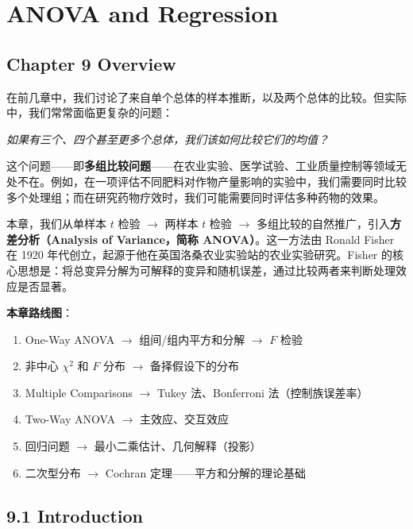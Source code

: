 
\chapter{ANOVA and Regression}\label{chap:anova-regression}

\section*{Chapter 9 Overview}

在前几章中，我们讨论了来自单个总体的样本推断，以及两个总体的比较。但实际中，我们常常面临更复杂的问题：

\begin{center}
\textit{如果有三个、四个甚至更多个总体，我们该如何比较它们的均值？}
\end{center}

这个问题——即\textbf{多组比较问题}——在农业实验、医学试验、工业质量控制等领域无处不在。例如，在一项评估不同肥料对作物产量影响的实验中，我们需要同时比较多个处理组；而在研究药物疗效时，我们可能需要同时评估多种药物的效果。

本章，我们从单样本 $t$ 检验 $\to$ 两样本 $t$ 检验 $\to$ 多组比较的自然推广，引入\textbf{方差分析（Analysis of Variance，简称 ANOVA）}。这一方法由 Ronald Fisher 在 1920 年代创立，起源于他在英国洛桑农业实验站的农业实验研究。Fisher 的核心思想是：将总变异分解为可解释的变异和随机误差，通过比较两者来判断处理效应是否显著。

\textbf{本章路线图}：
\begin{enumerate}
\item One-Way ANOVA $\to$ 组间/组内平方和分解 $\to$ $F$ 检验
\item 非中心 $\chi^2$ 和 $F$ 分布 $\to$ 备择假设下的分布
\item Multiple Comparisons $\to$ Tukey 法、Bonferroni 法（控制族误差率）
\item Two-Way ANOVA $\to$ 主效应、交互效应
\item 回归问题 $\to$ 最小二乘估计、几何解释（投影）
\item 二次型分布 $\to$ Cochran 定理——平方和分解的理论基础
\end{enumerate}

\section{9.1 Introduction}\label{sec:9.1}

